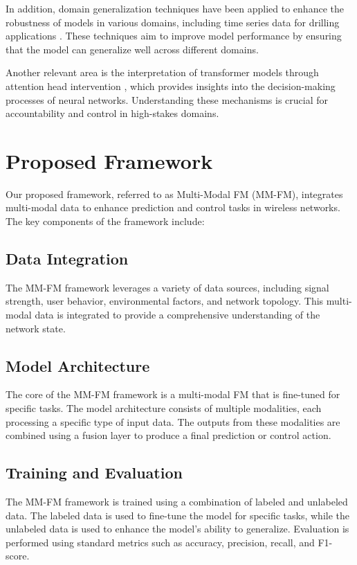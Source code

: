 \documentclass{article}
\begin{document}
In addition, domain generalization techniques have been applied to enhance the robustness of models in various domains, including time series data for drilling applications \cite{yahia2026domaingeneralizationtimeseries}. These techniques aim to improve model performance by ensuring that the model can generalize well across different domains. 

Another relevant area is the interpretation of transformer models through attention head intervention \cite{kadem2026interpretingtransformersattentionhead}, which provides insights into the decision-making processes of neural networks. Understanding these mechanisms is crucial for accountability and control in high-stakes domains.

\section{Proposed Framework}
Our proposed framework, referred to as Multi-Modal FM (MM-FM), integrates multi-modal data to enhance prediction and control tasks in wireless networks. The key components of the framework include:

\subsection{Data Integration}
The MM-FM framework leverages a variety of data sources, including signal strength, user behavior, environmental factors, and network topology. This multi-modal data is integrated to provide a comprehensive understanding of the network state.

\subsection{Model Architecture}
The core of the MM-FM framework is a multi-modal FM that is fine-tuned for specific tasks. The model architecture consists of multiple modalities, each processing a specific type of input data. The outputs from these modalities are combined using a fusion layer to produce a final prediction or control action.

\subsection{Training and Evaluation}
The MM-FM framework is trained using a combination of labeled and unlabeled data. The labeled data is used to fine-tune the model for specific tasks, while the unlabeled data is used to enhance the model's ability to generalize. Evaluation is performed using standard metrics such as accuracy, precision, recall, and F1-score.
\end{document}
